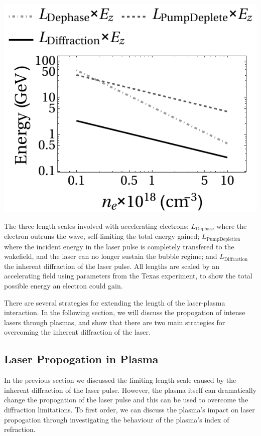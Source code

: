 \documentclass[12pt,letter]{article}
\begin{document}
    \begin{marginfigure}
            \includegraphics[width=\linewidth]{../figures/energy.pdf}
        \caption{The three length scales involved with accelerating electrons:
        $L_\mathrm{Dephase}$ where the electron outruns the wave, self-limiting
    the total energy gained; $L_\mathrm{Pump Depletion}$ where the incident
energy in the laser pulse is completely transfered to the wakefield, and the
laser can no longer sustain the bubble regime; and $L_\mathrm{Diffraction}$ the
inherent diffraction of the laser pulse. All lengths are scaled by an
accelerating field using parameters from the Texas
experiment\cite{Wang2013}, to show the total possible energy an electron
could gain.\label{fig:energy}}
    \end{marginfigure}

    There are several strategies for extending the length of the laser-plasma
    interaction. In the following section, we will discuss the propogation of
    intense lasers through plasmas, and show that there are two main strategies
    for overcoming the inherent diffraction of the laser.

    \subsection{Laser Propogation in Plasma}
   In the previous section we discussed the limiting length scale
   caused by the inherent diffraction of the laser pulse. However, the plasma
   itself can dramatically change the propogation of the laser pulse and this
   can be used to overcome the diffraction limitations. To first order, we can
   discuss the plasma's impact on laser propogation through investigating the
   behaviour of the plasma's index of refraction.
\end{document}

